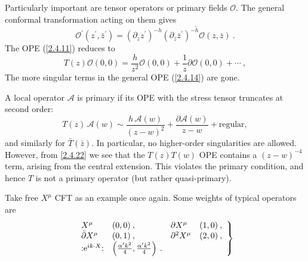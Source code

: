 Particularly important are tensor operators or primary fields $\mathcal{O}$.    
The general conformal transformation acting on them gives    
\begin{equation}
	\mathcal{O}^{\prime}(z^{\prime}, \bar{z}^{\prime})= (\partial_{z} z^{\prime})^{-h}(\partial_{\bar{z}} \bar{z}^{\prime})^{-\tilde{h}} \mathcal{O}(z, \bar{z}) \:.
\end{equation}
The OPE (\ref{2.4.11}) reduces to    
\begin{equation}\label{2.4.16}
	T(z) \mathcal{O}(0,0)=\frac{h}{z^{2}} \mathcal{O}(0,0)+\frac{1}{z} \partial \mathcal{O}(0,0)+\cdots \:,
\end{equation}
The more singular terms in the general OPE (\ref{2.4.14}) are gone.    
\begin{tcolorbox}[breakable]
\begin{remark}
	A local operator $\mathscr A$ is primary if its OPE with the stress tensor truncates at second order:
	\begin{equation}
		T(z)\,\mathscr A(w) \sim 
		\frac{h\,\mathscr A(w)}{(z-w)^2}
		+ \frac{\partial \mathscr A(w)}{z-w}
		+ \text{regular},
	\end{equation}
	and similarly for $\bar T(\bar z)$. In particular, no higher-order singularities are allowed. 
	However, from \eqref{2.4.22} we see that the $T(z)T(w)$ OPE contains a $(z-w)^{-4}$ term, arising from the central extension. This violates the primary condition, and hence $T$ is not a primary operator (but rather quasi-primary).
\end{remark}
\end{tcolorbox}
Take free $X^\mu$ CFT as an example once again. Some weights of typical operators are    
\begin{equation}
	\left.\begin{array}{llll}
		X^{\mu} & (0,0) \:, & \partial X^{\mu} & (1,0) \:, \\
		\bar{\partial} X^{\mu} & (0,1) \:, & \partial^{2} X^{\mu} & (2,0)  \:,\\
		: \mathrel{\mathrm{e}^{i k \cdot X}}: & \left(\frac{\alpha^{\prime} k^{2}}{4}, \frac{\alpha^{\prime} k^{2}}{4}\right) \:.
	\end{array}\right\} \label{2.4.17}
\end{equation}
